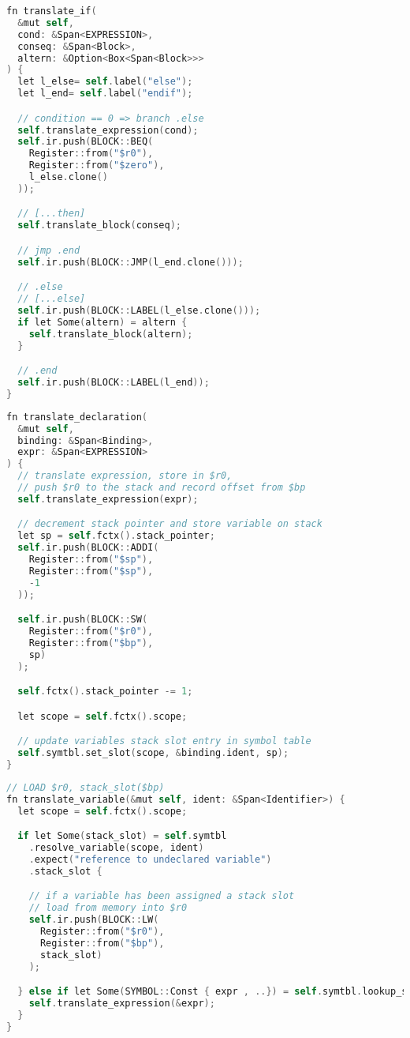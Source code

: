 \begin{lstlisting}[language=C]
fn translate_if(
  &mut self, 
  cond: &Span<EXPRESSION>, 
  conseq: &Span<Block>, 
  altern: &Option<Box<Span<Block>>>
) {
  let l_else= self.label("else");
  let l_end= self.label("endif");

  // condition == 0 => branch .else
  self.translate_expression(cond);
  self.ir.push(BLOCK::BEQ(
    Register::from("$r0"), 
    Register::from("$zero"), 
    l_else.clone()
  ));

  // [...then]
  self.translate_block(conseq);

  // jmp .end
  self.ir.push(BLOCK::JMP(l_end.clone()));

  // .else
  // [...else]
  self.ir.push(BLOCK::LABEL(l_else.clone()));
  if let Some(altern) = altern {
    self.translate_block(altern);
  }

  // .end
  self.ir.push(BLOCK::LABEL(l_end));
}
\end{lstlisting}

\begin{lstlisting}[language=C]
fn translate_declaration(
  &mut self, 
  binding: &Span<Binding>, 
  expr: &Span<EXPRESSION>
) {
  // translate expression, store in $r0, 
  // push $r0 to the stack and record offset from $bp
  self.translate_expression(expr);

  // decrement stack pointer and store variable on stack
  let sp = self.fctx().stack_pointer;
  self.ir.push(BLOCK::ADDI(
    Register::from("$sp"), 
    Register::from("$sp"), 
    -1
  ));

  self.ir.push(BLOCK::SW(
    Register::from("$r0"), 
    Register::from("$bp"), 
    sp)
  );

  self.fctx().stack_pointer -= 1;

  let scope = self.fctx().scope;

  // update variables stack slot entry in symbol table
  self.symtbl.set_slot(scope, &binding.ident, sp);
}
\end{lstlisting}

\begin{lstlisting}[language=C]
// LOAD $r0, stack_slot($bp) 
fn translate_variable(&mut self, ident: &Span<Identifier>) {
  let scope = self.fctx().scope;

  if let Some(stack_slot) = self.symtbl
    .resolve_variable(scope, ident)
    .expect("reference to undeclared variable")
    .stack_slot {

    // if a variable has been assigned a stack slot 
    // load from memory into $r0
    self.ir.push(BLOCK::LW(
      Register::from("$r0"), 
      Register::from("$bp"), 
      stack_slot)
    );

  } else if let Some(SYMBOL::Const { expr , ..}) = self.symtbl.lookup_symbol(ident){
    self.translate_expression(&expr);
  }
}
\end{lstlisting}

